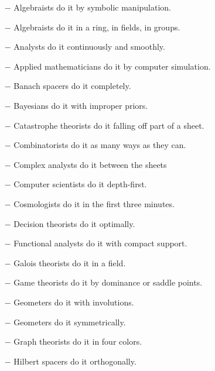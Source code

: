 \begin{itemize}	 
	\item[$-$] Algebraists do it by symbolic manipulation.

	\item[$-$] Algebraists do it in a ring, in fields, in groups.

	\item[$-$] Analysts do it continuously and smoothly.

	\item[$-$] Applied mathematicians do it by computer simulation.

	\item[$-$] Banach spacers do it completely.

	\item[$-$] Bayesians do it with improper priors.

	\item[$-$] Catastrophe theorists do it falling off part of a sheet.

	\item[$-$] Combinatorists do it as many ways as they can.

	\item[$-$] Complex analysts do it between the sheets

	\item[$-$] Computer scientists do it depth-first.

	\item[$-$] Cosmologists do it in the first three minutes.

	\item[$-$] Decision theorists do it optimally.

	\item[$-$] Functional analysts do it with compact support.

	\item[$-$] Galois theorists do it in a field.

	\item[$-$] Game theorists do it by dominance or saddle points.

	\item[$-$] Geometers do it with involutions.

	\item[$-$] Geometers do it symmetrically.

	\item[$-$] Graph theorists do it in four colors.

	\item[$-$] Hilbert spacers do it orthogonally.


\end{itemize}
